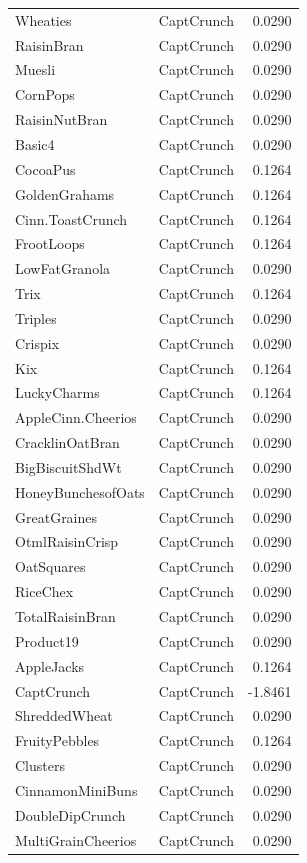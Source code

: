 \begin{longtable}{llr}
Wheaties & CaptCrunch & 0.0290 \\
RaisinBran & CaptCrunch & 0.0290 \\
Muesli & CaptCrunch & 0.0290 \\
CornPops & CaptCrunch & 0.0290 \\
RaisinNutBran & CaptCrunch & 0.0290 \\
Basic4 & CaptCrunch & 0.0290 \\
CocoaPus & CaptCrunch & 0.1264 \\
GoldenGrahams & CaptCrunch & 0.1264 \\
Cinn.ToastCrunch & CaptCrunch & 0.1264 \\
FrootLoops & CaptCrunch & 0.1264 \\
LowFatGranola & CaptCrunch & 0.0290 \\
Trix & CaptCrunch & 0.1264 \\
Triples & CaptCrunch & 0.0290 \\
Crispix & CaptCrunch & 0.0290 \\
Kix & CaptCrunch & 0.1264 \\
LuckyCharms & CaptCrunch & 0.1264 \\
AppleCinn.Cheerios & CaptCrunch & 0.0290 \\
CracklinOatBran & CaptCrunch & 0.0290 \\
BigBiscuitShdWt & CaptCrunch & 0.0290 \\
HoneyBunchesofOats & CaptCrunch & 0.0290 \\
GreatGraines & CaptCrunch & 0.0290 \\
OtmlRaisinCrisp & CaptCrunch & 0.0290 \\
OatSquares & CaptCrunch & 0.0290 \\
RiceChex & CaptCrunch & 0.0290 \\
TotalRaisinBran & CaptCrunch & 0.0290 \\
Product19 & CaptCrunch & 0.0290 \\
AppleJacks & CaptCrunch & 0.1264 \\
CaptCrunch & CaptCrunch & -1.8461 \\
ShreddedWheat & CaptCrunch & 0.0290 \\
FruityPebbles & CaptCrunch & 0.1264 \\
Clusters & CaptCrunch & 0.0290 \\
CinnamonMiniBuns & CaptCrunch & 0.0290 \\
DoubleDipCrunch & CaptCrunch & 0.0290 \\
MultiGrainCheerios & CaptCrunch & 0.0290 \\

\end{longtable}
